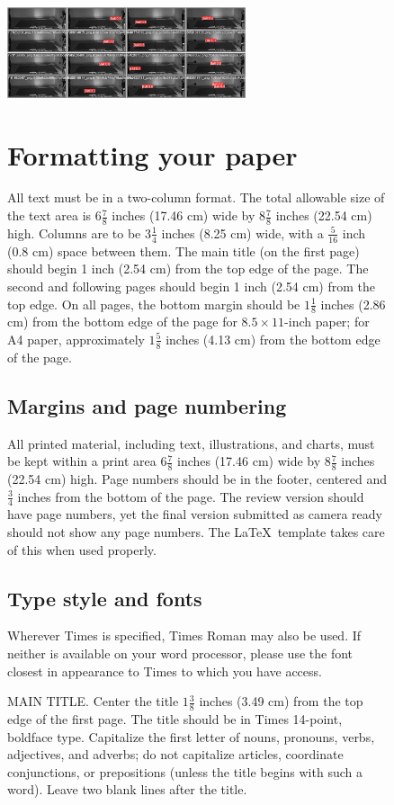 \documentclass[10pt,twocolumn,letterpaper]{article}
\begin{document}
\begin{figure}{
  \includegraphics[width=7cm]{validation.jpeg}
}
\section{Formatting your paper}
\label{sec:formatting}

All text must be in a two-column format.
The total allowable size of the text area is $6\frac78$ inches (17.46 cm) wide by $8\frac78$ inches (22.54 cm) high.
Columns are to be $3\frac14$ inches (8.25 cm) wide, with a $\frac{5}{16}$ inch (0.8 cm) space between them.
The main title (on the first page) should begin 1 inch (2.54 cm) from the top edge of the page.
The second and following pages should begin 1 inch (2.54 cm) from the top edge.
On all pages, the bottom margin should be $1\frac{1}{8}$ inches (2.86 cm) from the bottom edge of the page for $8.5 \times 11$-inch paper;
for A4 paper, approximately $1\frac{5}{8}$ inches (4.13 cm) from the bottom edge of the
page.

\subsection{Margins and page numbering}

All printed material, including text, illustrations, and charts, must be kept
within a print area $6\frac{7}{8}$ inches (17.46 cm) wide by $8\frac{7}{8}$ inches (22.54 cm)
high.
%
Page numbers should be in the footer, centered and $\frac{3}{4}$ inches from the bottom of the page.
The review version should have page numbers, yet the final version submitted as camera ready should not show any page numbers.
The \LaTeX\ template takes care of this when used properly.



\subsection{Type style and fonts}

Wherever Times is specified, Times Roman may also be used.
If neither is available on your word processor, please use the font closest in
appearance to Times to which you have access.

MAIN TITLE.
Center the title $1\frac{3}{8}$ inches (3.49 cm) from the top edge of the first page.
The title should be in Times 14-point, boldface type.
Capitalize the first letter of nouns, pronouns, verbs, adjectives, and adverbs;
do not capitalize articles, coordinate conjunctions, or prepositions (unless the title begins with such a word).
Leave two blank lines after the title.


\end{figure}
\end{document}
